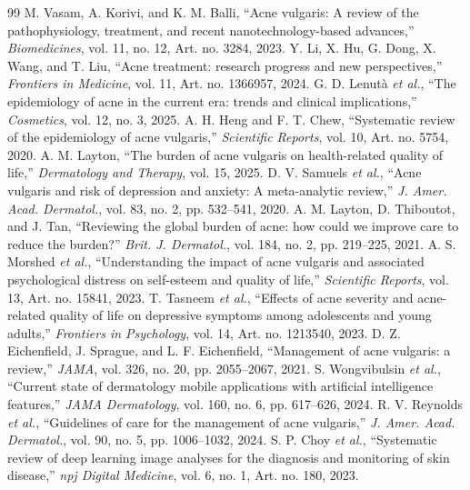 \documentclass[conference]{IEEEtran}
\begin{document}
\begin{thebibliography}{99}
M. Vasam, A. Korivi, and K. M. Balli, ``Acne vulgaris: A review of the pathophysiology, treatment, and recent nanotechnology-based advances,'' \emph{Biomedicines}, vol. 11, no. 12, Art. no. 3284, 2023.
Y. Li, X. Hu, G. Dong, X. Wang, and T. Liu, ``Acne treatment: research progress and new perspectives,'' \emph{Frontiers in Medicine}, vol. 11, Art. no. 1366957, 2024.
G. D. Lenut\`{a} \emph{et al.}, ``The epidemiology of acne in the current era: trends and clinical implications,'' \emph{Cosmetics}, vol. 12, no. 3, 2025.
A. H. Heng and F. T. Chew, ``Systematic review of the epidemiology of acne vulgaris,'' \emph{Scientific Reports}, vol. 10, Art. no. 5754, 2020.
A. M. Layton, ``The burden of acne vulgaris on health-related quality of life,'' \emph{Dermatology and Therapy}, vol. 15, 2025.
D. V. Samuels \emph{et al.}, ``Acne vulgaris and risk of depression and anxiety: A meta-analytic review,'' \emph{J. Amer. Acad. Dermatol.}, vol. 83, no. 2, pp. 532--541, 2020.
A. M. Layton, D. Thiboutot, and J. Tan, ``Reviewing the global burden of acne: how could we improve care to reduce the burden?'' \emph{Brit. J. Dermatol.}, vol. 184, no. 2, pp. 219--225, 2021.
A. S. Morshed \emph{et al.}, ``Understanding the impact of acne vulgaris and associated psychological distress on self-esteem and quality of life,'' \emph{Scientific Reports}, vol. 13, Art. no. 15841, 2023.
T. Tasneem \emph{et al.}, ``Effects of acne severity and acne-related quality of life on depressive symptoms among adolescents and young adults,'' \emph{Frontiers in Psychology}, vol. 14, Art. no. 1213540, 2023.
D. Z. Eichenfield, J. Sprague, and L. F. Eichenfield, ``Management of acne vulgaris: a review,'' \emph{JAMA}, vol. 326, no. 20, pp. 2055--2067, 2021.
S. Wongvibulsin \emph{et al.}, ``Current state of dermatology mobile applications with artificial intelligence features,'' \emph{JAMA Dermatology}, vol. 160, no. 6, pp. 617--626, 2024.
R. V. Reynolds \emph{et al.}, ``Guidelines of care for the management of acne vulgaris,'' \emph{J. Amer. Acad. Dermatol.}, vol. 90, no. 5, pp. 1006--1032, 2024.
S. P. Choy \emph{et al.}, ``Systematic review of deep learning image analyses for the diagnosis and monitoring of skin disease,'' \emph{npj Digital Medicine}, vol. 6, no. 1, Art. no. 180, 2023.

\end{thebibliography}
\end{document}
